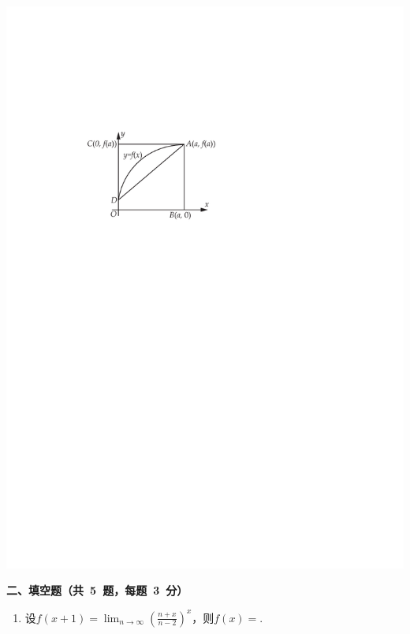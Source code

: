 \documentclass[11pt,a4paper]{ctexart}
\begin{document}
\begin{framed}
\begin{enumerate}
		\begin{center}
			\includegraphics[scale = 0.7]{fig/figure1.pdf}
		\end{center}


		
		

		
	\end{enumerate}
	\begin{large}
			\noindent\textbf{二、填空题（共~5~题，每题~3~分）}
	\end{large}        
	\begin{enumerate}

		\item 设\(f(x + 1) = \displaystyle \lim_{n \to \infty} \left(\frac{n + x}{n - 2}\right)^x\)，则\(f(x) = \)\tk{}.


\end{enumerate}
\end{framed}
\end{document}
